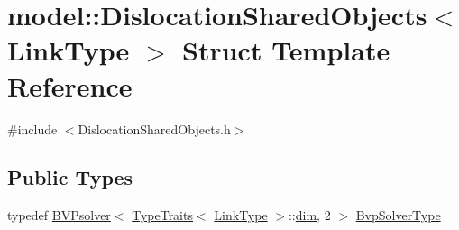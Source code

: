 \hypertarget{structmodel_1_1_dislocation_shared_objects}{}\section{model\+:\+:Dislocation\+Shared\+Objects$<$ Link\+Type $>$ Struct Template Reference}
\label{structmodel_1_1_dislocation_shared_objects}


{\ttfamily \#include $<$Dislocation\+Shared\+Objects.\+h$>$}

\subsection*{Public Types}
\begin{DoxyCompactItemize}
\item 
typedef \hyperlink{classmodel_1_1_b_v_psolver}{B\+V\+Psolver}$<$ \hyperlink{structmodel_1_1_type_traits}{Type\+Traits}$<$ \hyperlink{_spline_node_base__corder0_8h_ab09ccc0af6ea9402dfef7b0eac55cff3}{Link\+Type} $>$\+::\hyperlink{plot_nd_a_8m_a382f3ca768b275b8d563604f7fc7df73}{dim}, 2 $>$ \hyperlink{structmodel_1_1_dislocation_shared_objects_a7562afb5a99947edfee0669cfe78f8b6}{Bvp\+Solver\+Type}
\end{DoxyCompactItemize}
